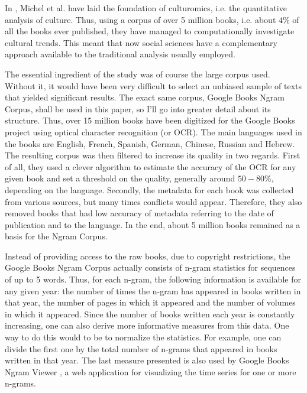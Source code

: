 
In \cite{Michel14012011}, Michel et al. have laid the foundation of culturomics, i.e. the quantitative analysis of culture. Thus, using a corpus of over 5 million books, i.e. about $4 \%$ of all the books ever published, they have managed to computationally investigate cultural trends. This meant that now social sciences have a complementary approach available to the traditional analysis usually employed.

The essential ingredient of the study was of course the large corpus used. Without it, it would have been very difficult to select an unbiased sample of texts that yielded significant results. The exact same corpus, Google Books Ngram Corpus, shall be used in this paper, so I'll go into greater detail about its structure. Thus, over 15 million books have been digitized for the Google Books project using optical character recognition (or OCR). The main languages used in the books are English, French, Spanish, German, Chinese, Russian and Hebrew. The resulting corpus was then filtered to increase its quality in two regards. First of all, they used a clever algorithm to estimate the accuracy of the OCR for any given book and set a threshold on the quality, generally around $50 - 80 \%$, depending on the language. Secondly, the metadata for each book was collected from various sources, but many times conflicts would appear. Therefore, they also removed books that had low accuracy of metadata referring to the date of publication and to the language. In the end, about 5 million books remained as a basis for the Ngram Corpus.

Instead of providing access to the raw books, due to copyright restrictions, the Google Books Ngram Corpus actually consists of n-gram statistics for sequences of up to 5 words. Thus, for each n-gram, the following information is available for any given year: the number of times the n-gram has appeared in books written in that year, the number of pages in which it appeared and the number of volumes in which it appeared. Since the number of books written each year is constantly increasing, one can also derive more informative measures from this data. One way to do this would to be to normalize the statistics. For example, one can divide the first one by the total number of n-grams that appeared in books written in that year. The last measure presented is also used by Google Books Ngram Viewer \cite{ngramviewer}, a web application for visualizing the time series for one or more n-grams.

